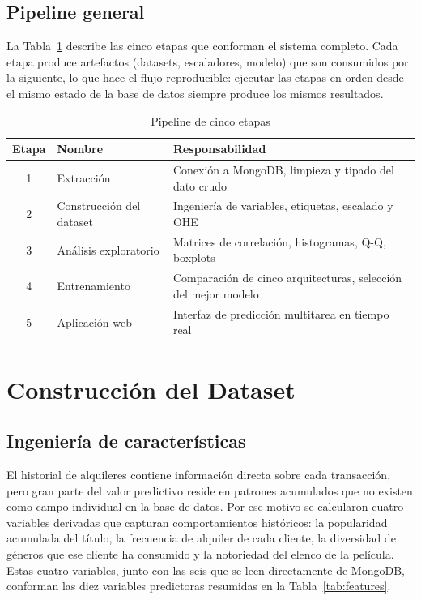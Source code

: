 \documentclass[12pt, a4paper]{report}
\begin{document}
\section{Pipeline general}

La Tabla~\ref{tab:pipeline} describe las cinco etapas que conforman el sistema completo. Cada etapa produce artefactos (datasets, escaladores, modelo) que son consumidos por la siguiente, lo que hace el flujo reproducible: ejecutar las etapas en orden desde el mismo estado de la base de datos siempre produce los mismos resultados.

\begin{table}[H]
\centering
\caption{Pipeline de cinco etapas}
\label{tab:pipeline}
\begin{tabular}{@{} c p{3.5cm} p{7.5cm} @{}}
\toprule
\textbf{Etapa} & \textbf{Nombre} & \textbf{Responsabilidad} \\
\midrule
1 & Extracción              & Conexión a MongoDB, limpieza y tipado del dato crudo \\
2 & Construcción del dataset & Ingeniería de variables, etiquetas, escalado y OHE \\
3 & Análisis exploratorio    & Matrices de correlación, histogramas, Q-Q, boxplots \\
4 & Entrenamiento            & Comparación de cinco arquitecturas, selección del mejor modelo \\
5 & Aplicación web           & Interfaz de predicción multitarea en tiempo real \\
\bottomrule
\end{tabular}
\end{table}

\chapter{Construcción del Dataset}
\label{cap:dataset}

\section{Ingeniería de características}

El historial de alquileres contiene información directa sobre cada transacción, pero gran parte del valor predictivo reside en patrones acumulados que no existen como campo individual en la base de datos. Por ese motivo se calcularon cuatro variables derivadas que capturan comportamientos históricos: la popularidad acumulada del título, la frecuencia de alquiler de cada cliente, la diversidad de géneros que ese cliente ha consumido y la notoriedad del elenco de la película. Estas cuatro variables, junto con las seis que se leen directamente de MongoDB, conforman las diez variables predictoras resumidas en la Tabla~\ref{tab:features}.
\end{document}
